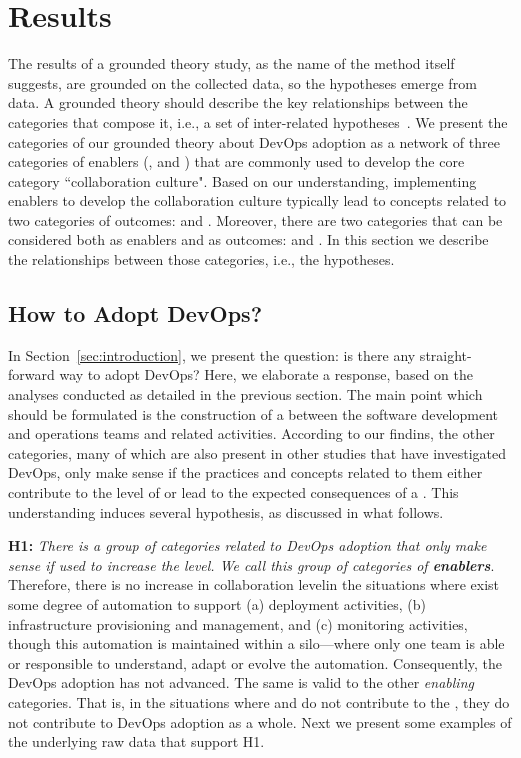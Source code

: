 \section{Results} \label{sec:results}

The results of a grounded theory study, as the name of the method itself
suggests, are grounded on the collected data, so the hypotheses emerge from
data. A grounded theory should describe the key relationships between the
categories that compose it, i.e., a set of inter-related hypotheses~\cite{hoda2017becoming}.
We present the categories of our grounded theory
about DevOps adoption as a network of three categories of enablers (,
 and ) that are commonly used to develop the core category
``collaboration culture". Based on our understanding, implementing enablers to develop the collaboration
culture typically lead to concepts related to two categories of outcomes:
 and . Moreover, there are two categories that can be considered
both as enablers and as outcomes:  and .
In this section we describe the relationships between those categories, i.e.,
the hypotheses.

\subsection{How to Adopt DevOps?}

In Section~\ref{sec:introduction}, we present the question: is there any
straight-forward way to adopt DevOps? Here, we elaborate a response,
based on the analyses conducted as detailed in the previous section. The main
point which should be formulated is the construction of a  between the software development and operations teams and 
related activities. According to our findins, the other categories, 
many of which are also present in other studies that have investigated DevOps, 
only make sense if the practices and
concepts related to them either contribute to the level of  or lead to the expected consequences of a . This understanding induces several hypothesis, as discussed in 
what follows. 

\textbf{H1:} \textit{There is a group of categories related to DevOps adoption
that only make sense if used to increase the  level. We
call this group of categories of \textbf{enablers}}. Therefore, there is no increase in collaboration 
levelin the situations 
where exist some degree of
automation to support (a) deployment activities, (b) infrastructure provisioning and management, 
and (c) monitoring activities, though this automation is maintained within a silo---where
only one team is able or responsible to understand, adapt or
evolve the automation. Consequently, the DevOps adoption has not advanced. The same is valid to the
other \emph{enabling} categories. That is, in the situations where 
 and  do not contribute to
the , they do not contribute to DevOps adoption as a whole. Next
we present some examples of the underlying raw data that support H1. 


